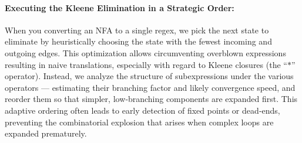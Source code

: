 \paragraph{Executing the Kleene Elimination in a Strategic Order:}
When you converting an NFA to a single regex, we pick the next state to eliminate by heuristically choosing the  state with the fewest incoming and outgoing edges.
This optimization allows circumventing 
overblown expressions resulting in naive translations, especially with regard to  Kleene closures (the “\(\mathsf{*}\)” operator).  Instead, we analyze the structure of subexpressions under the various operators --- estimating their branching factor and likely convergence speed, and reorder them so that simpler, low‐branching components are expanded first.  This adaptive ordering often leads to early detection of fixed points or dead‐ends, preventing the combinatorial explosion that arises when complex loops are expanded prematurely.  




